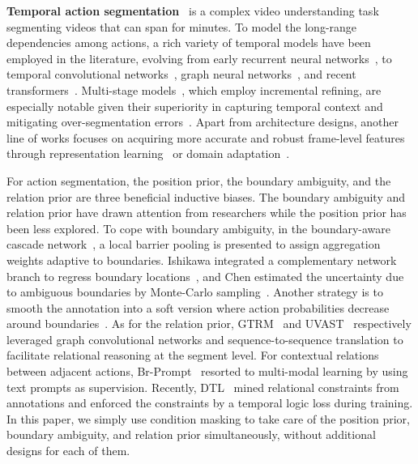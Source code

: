 \documentclass[10pt,twocolumn,letterpaper]{article}
\begin{document}
\textbf{Temporal action segmentation}~\cite{2022_Arxiv_Ding} is a complex video understanding task segmenting videos that can span for minutes.
To model the long-range dependencies among actions, a rich variety of temporal models have been employed in the literature, evolving from early recurrent neural networks~\cite{2017_Arxiv_Li,2016_CVPR_Singh}, to temporal convolutional networks~\cite{2016_ECCV_Lea,2017_CVPR_Lea,2018_CVPR_Lei,2019_CVPR_Farha,2019_ICCV_Mac,2019_ICIP_Wang,2020_3DV_Hampiholi,2020_PAMI_Li,2020_NC_Wang,2021_GCPR_Souri,2021_CVPR_Gao,2021_Arxiv_Singhania,2021_NC_Li,2022_PR_Park,2022_IJCNN_Zhang}, graph neural networks~\cite{2020_CVPR_Huang,2022_Arxiv_Zhang}, and recent transformers~\cite{2021_BMVC_Yi,2022_IVC_Aziere,2022_Arxiv_Wang,2022_Arxiv_Du,2022_NPL_Du,2022_MS_Tian,2023_Arxiv_Liu}.
Multi-stage models~\cite{2021_BMVC_Yi,2022_IVC_Aziere,2020_PAMI_Li,2020_NC_Wang,2019_CVPR_Farha,2022_PR_Park,2020_ECCV_Wang}, which employ incremental refining, are especially notable given their superiority in capturing temporal context and mitigating over-segmentation errors~\cite{2022_Arxiv_Ding}.
Apart from architecture designs, another line of works focuses on acquiring more accurate and robust frame-level features through representation learning~\cite{2021_ICCV_Ahn,2020_ECCV_Sener,2022_CVPR_Li} or domain adaptation~\cite{2020_WACV_Chen,2020_CVPR_Chen}.

For action segmentation, the position prior, the boundary ambiguity, and the relation prior are three beneficial inductive biases.
The boundary ambiguity and relation prior have drawn attention from researchers while the position prior has been less explored.
To cope with boundary ambiguity, in the boundary-aware cascade network~\cite{2020_ECCV_Wang}, a local barrier pooling is presented to assign aggregation weights adaptive to boundaries.
Ishikawa \etal integrated a complementary network branch to regress boundary locations~\cite{2021_WACV_Ishikawa}, and Chen \etal estimated the uncertainty due to ambiguous boundaries by Monte-Carlo sampling~\cite{2022_IJCAI_Chen}.
Another strategy is to smooth the annotation into a soft version where action probabilities decrease around boundaries~\cite{2022_EL_Kim}.
As for the relation prior, GTRM~\cite{2020_CVPR_Huang} and UVAST~\cite{2022_ECCV_Behrmann} respectively leveraged graph convolutional networks and sequence-to-sequence translation to facilitate relational reasoning at the segment level.
For contextual relations between adjacent actions, Br-Prompt~\cite{2022_CVPR_Li} resorted to multi-modal learning by using text prompts as supervision.
Recently, DTL~\cite{2022_NeurIPS_Xu} mined relational constraints from annotations and enforced the constraints by a temporal logic loss during training.
In this paper, we simply use condition masking to take care of the position prior, boundary ambiguity, and relation prior simultaneously, without additional designs for each of them.
\end{document}
